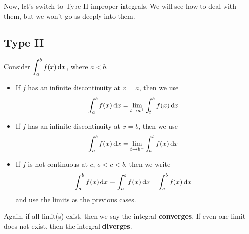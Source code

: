 Now, let's switch to Type II improper integrals. We will see how to deal with them, but we won't
go as deeply into them.

\subsection*{Type II}
Consider $ \displaystyle \int_{a}^{b} f(x)\odif{x}  $, where $ a<b $.
\begin{itemize}
    \item If $ f $ has an infinite discontinuity at $ x=a $, then we use
        \[ \int_{a}^{b} f(x)\odif{x} =\lim\limits_{{t} \to {a^+}} \int_{t}^{b} f(x)\odif{x} \]
    \item If $ f $ has an infinite discontinuity at $ x=b $, then we use
        \[ \int_{a}^{b} f(x)\odif{x} =\lim\limits_{{t} \to {b^-}} \int_{a}^{t} f(x)\odif{x} \]
    \item If $ f $ is not continuous at $ c $, $ a<c<b $, then we write
        \[  \int_{a}^{b} f(x)\odif{x} =\int_{a}^{c} f(x)\odif{x} +\int_{c}^{b} f(x)\odif{x} \]
        and use the limits as the previous cases.
\end{itemize}
Again, if all limit(s) exist, then we say the integral \textbf{converges}. If even one
limit does not exist, then the integral \textbf{diverges}.

